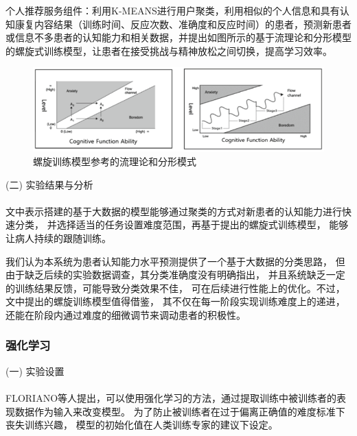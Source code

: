 \documentclass{article}
\begin{document}
            个人推荐服务组件：利用K-MEANS进行用户聚类，利用相似的个人信息和具有认知康复内容结果（训练时间、反应次数、准确度和反应时间）的患者，预测新患者或信息不多患者的认知能力和相关数据，并提出如图所示的基于流理论和分形模型的螺旋式训练模型，让患者在接受挑战与精神放松之间切换，提高学习效率。
            \begin{figure}[H]
            	
            	\centering
            	\includegraphics[scale=0.7]{images/flow_theory.png}
            	\caption{螺旋训练模型参考的流理论和分形模式}
            	\label{fig:label}
            \end{figure}
            
            


            (二) 实验结果与分析\paragraph{}
            文中表示搭建的基于大数据的模型能够通过聚类的方式对新患者的认知能力进行快速分类，
            并选择适当的任务设置难度范围，再基于提出的螺旋式训练模型，
            能够让病人持续的跟随训练。

            我们认为本系统为患者认知能力水平预测提供了一个基于大数据的分类思路，
            但由于缺乏后续的实验数据调查，其分类准确度没有明确指出，
            并且系统缺乏一定的训练结果反馈，可能导致分类效果不佳，
            可在后续进行性能上的优化。不过，文中提出的螺旋训练模型值得借鉴，
            其不仅在每一阶段实现训练难度上的递进，
            还能在阶段内通过难度的细微调节来调动患者的积极性。






            \subsubsection{强化学习}
            (一) 实验设置\paragraph{}
            FLORIANO\cite{ref12}等人提出，可以使用强化学习的方法，通过提取训练中被训练者的表现数据作为输入来改变模型。
            为了防止被训练者在过于偏离正确值的难度标准下丧失训练兴趣，
            模型的初始化值在人类训练专家的建议下设定。
\end{document}
